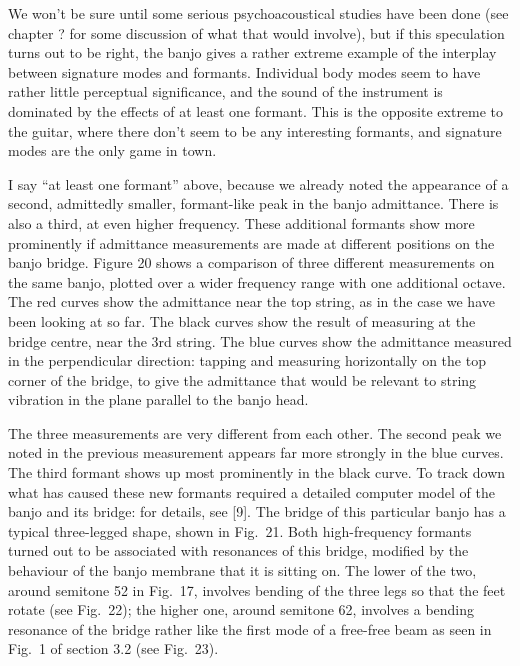  We won't be sure until some serious psychoacoustical studies have been done 
  (see chapter ? for some discussion of what that would involve), but if this 
  speculation turns out to be right, the banjo gives a rather extreme example 
  of the interplay between signature modes and formants. Individual body modes 
  seem to have rather little perceptual significance, and the sound of the 
  instrument is dominated by the effects of at least one formant. This is the 
  opposite extreme to the guitar, where there don't seem to be any interesting 
  formants, and signature modes are the only game in town. 

  I say ``at least one formant'' above, because we already noted the appearance 
  of a second, admittedly smaller, formant-like peak in the banjo admittance. 
  There is also a third, at even higher frequency. These additional formants 
  show more prominently if admittance measurements are made at different 
  positions on the banjo bridge. Figure 20 shows a comparison of three 
  different measurements on the same banjo, plotted over a wider frequency 
  range with one additional octave. The red curves show the admittance near the 
  top string, as in the case we have been looking at so far. The black curves 
  show the result of measuring at the bridge centre, near the 3rd string. The 
  blue curves show the admittance measured in the perpendicular direction: 
  tapping and measuring horizontally on the top corner of the bridge, to give 
  the admittance that would be relevant to string vibration in the plane 
  parallel to the banjo head. 


  The three measurements are very different from each other. The second peak we 
  noted in the previous measurement appears far more strongly in the blue 
  curves. The third formant shows up most prominently in the black curve. To 
  track down what has caused these new formants required a detailed computer 
  model of the banjo and its bridge: for details, see [9]. The bridge of this 
  particular banjo has a typical three-legged shape, shown in Fig.\ 21. Both 
  high-frequency formants turned out to be associated with resonances of this 
  bridge, modified by the behaviour of the banjo membrane that it is sitting 
  on. The lower of the two, around semitone 52 in Fig.\ 17, involves bending of 
  the three legs so that the feet rotate (see Fig.\ 22); the higher one, around 
  semitone 62, involves a bending resonance of the bridge rather like the first 
  mode of a free-free beam as seen in Fig.\ 1 of section 3.2 (see Fig.\ 23). 

